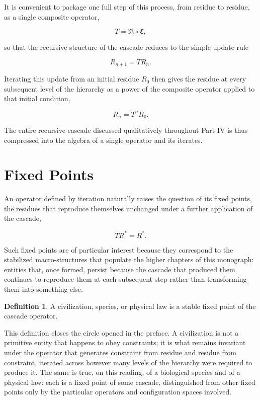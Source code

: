 \documentclass[11pt,oneside]{book}
\theoremstyle{plain}
\theoremstyle{definition}
\newtheorem{definition}[theorem]{Definition}
\theoremstyle{remark}
\begin{document}
It is convenient to package one full step of this process, from residue to residue, as a single composite operator,

\[
T
=
\mathfrak R\circ\mathfrak C,
\]

so that the recursive structure of the cascade reduces to the simple update rule

\[
R_{n+1}
=
TR_n.
\]

Iterating this update from an initial residue \(R_0\) then gives the residue at every subsequent level of the hierarchy as a power of the composite operator applied to that initial condition,

\[
R_n
=
T^nR_0.
\]

The entire recursive cascade discussed qualitatively throughout Part IV is thus compressed into the algebra of a single operator and its iterates.

\section{Fixed Points}

An operator defined by iteration naturally raises the question of its fixed points, the residues that reproduce themselves unchanged under a further application of the cascade,

\[
TR^\ast
=
R^\ast.
\]

Such fixed points are of particular interest because they correspond to the stabilized macro-structures that populate the higher chapters of this monograph: entities that, once formed, persist because the cascade that produced them continues to reproduce them at each subsequent step rather than transforming them into something else.

\begin{definition}
A civilization,
species,
or physical law is a stable fixed point
of the cascade operator.
\end{definition}

This definition closes the circle opened in the preface. A civilization is not a primitive entity that happens to obey constraints; it is what remains invariant under the operator that generates constraint from residue and residue from constraint, iterated across however many levels of the hierarchy were required to produce it. The same is true, on this reading, of a biological species and of a physical law: each is a fixed point of some cascade, distinguished from other fixed points only by the particular operators and configuration spaces involved.
\end{document}
